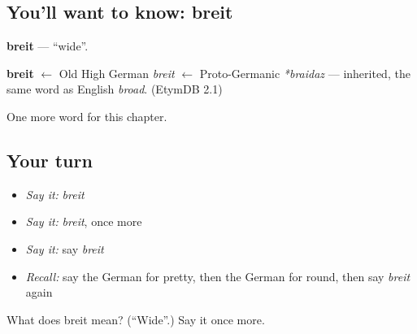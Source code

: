 \subsection*{You'll want to know: breit}
\textbf{breit} — \textquotedblleft{}wide\textquotedblright{}.

\begin{cousinweb}
\textbf{breit} $\leftarrow$ Old High German \emph{breit} $\leftarrow$ Proto-Germanic \emph{*braidaz} — inherited, the same word as English \emph{broad}. (EtymDB 2.1)
\end{cousinweb}

\begin{grammarlens}[title={What you've built}]
One more word for this chapter.
\end{grammarlens}

\subsection*{Your turn}
\begin{itemize}
\raggedright
  \item \emph{Say it:} \emph{breit}
  \item \emph{Say it:} \emph{breit}, once more
  \item \emph{Say it:} say \emph{breit}
  \item \emph{Recall:} say the German for pretty, then the German for round, then say \emph{breit} again
\end{itemize}

\begin{tcolorbox}[breakable,colback=teal!4,colframe=teal!35!black,title={Before you move on}]
What does breit mean? (\textquotedblleft{}Wide\textquotedblright{}.) Say it once more.
\end{tcolorbox}
